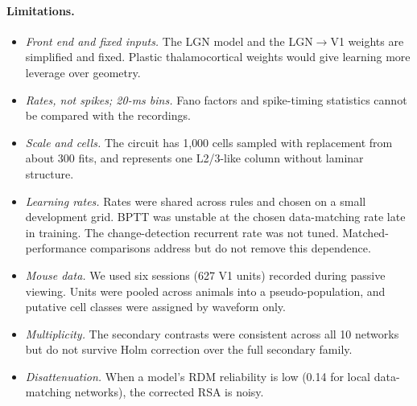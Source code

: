 \paragraph{Limitations.}
\begin{itemize}
\item \emph{Front end and fixed inputs.} The LGN model and the LGN$\to$V1 weights are simplified
and fixed. Plastic thalamocortical weights would give learning more leverage over geometry.
\item \emph{Rates, not spikes; 20-ms bins.} Fano factors and spike-timing statistics cannot be
compared with the recordings.
\item \emph{Scale and cells.} The circuit has 1{,}000 cells sampled with replacement from about 300
fits, and represents one L2/3-like column without laminar structure.
\item \emph{Learning rates.} Rates were shared across rules and chosen on a small development grid.
BPTT was unstable at the chosen data-matching rate late in training. The change-detection
recurrent rate was not tuned. Matched-performance comparisons address but do not remove this
dependence.
\item \emph{Mouse data.} We used six sessions (627 V1 units) recorded during passive viewing. Units
were pooled across animals into a pseudo-population, and putative cell classes were assigned by
waveform only.
\item \emph{Multiplicity.} The secondary contrasts were consistent across all 10 networks but do not
survive Holm correction over the full secondary family.
\item \emph{Disattenuation.} When a model's RDM reliability is low (0.14 for local data-matching
networks), the corrected RSA is noisy.
\end{itemize}
